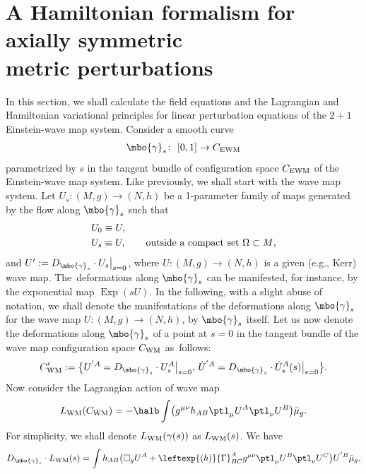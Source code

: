 \section[A Hamiltonian formalism for axially symmetric metric perturbations]{A Hamiltonian formalism for axially symmetric\\ metric perturbations}\label{section3}

In this section, we shall calculate the field equations and the Lagrangian and Hamiltonian variational principles for linear perturbation equations of the $2 + 1$ Einstein-wave map system. Consider a smooth curve
\begin{align*}
\mbo{\gamma}_s \colon\ [0, 1] \to C_{{\rm EWM}}
\end{align*}
parametrized by $s$ in the tangent bundle of configuration space $C_{{\rm EWM}}$ of the Einstein-wave map system. Like previously, we shall start with the wave map system. Let $U_s \colon (M, g) \to (N, h)$ be a 1-parameter family of maps generated by the flow along $\mbo{\gamma}_s$ such that
\begin{align*}
&U_0 \equiv U, \\
& U_s \equiv U, \qquad \textnormal{outside a compact set $\Omega \subset M$},
\end{align*}
and $ U' := D_{\mbo{\gamma}_s} \cdot U_s \big\vert_{s=0}$, where $U \colon (M, g) \to (N, h)$ is a given (e.g., Kerr) wave map. The~deformations along $\mbo{\gamma}_s$ can be manifested, for instance, by the exponential map $\operatorname{Exp}(s U)$. In the following, with a slight abuse of notation, we shall denote the manifestations of the deformations along $\mbo{\gamma}_s$ for the wave map $U \colon (M,g) \to (N, h)$, by $\mbo{\gamma}_s$ itself. Let us now denote the deformations along $\mbo{\gamma}_s$ of a point at $s=0$ in the tangent bundle of the wave map configuration space $C_{{\rm WM}}$ as~follows:
\begin{align*}
C'_{ {\rm WM}} := \bigl\{
U^{'A} = D_{\mbo{\gamma}_s} \cdot U_s^{A} \big\vert_{s=0}, \, \dot{U}^{'A} = D_{\mbo{\gamma}_s} \cdot \dot{U}_s^{A} (s) \big\vert_{s=0} \bigr\}.
\end{align*}
Now consider the Lagrangian action of wave map
\begin{align} \label{wm-action-again}
L_{{\rm WM}} (C_{{\rm WM}}) = -\halb \int \bigl(g^{\mu \nu}h_{AB} \ptl_\mu U^A \ptl_\nu U^B\bigr) \bar{\mu}_g.
\end{align}
For simplicity, we shall denote $L_{{\rm WM}}(\gamma(s))$ as $L_{{\rm WM}}(s)$. We have
\begin{align}\label{1-var-wm}
D_{\mbo{\gamma}_s} \cdot L_{{\rm WM}}(s) = \int h_{AB} \bigl(\square_g U^A + \leftexp{(h)}{\Gamma}^A_{BC} g^{\mu \nu} \ptl_\mu U^B \ptl_\nu U^C\bigr) U^{'B} \bar{\mu}_g,
\end{align}
